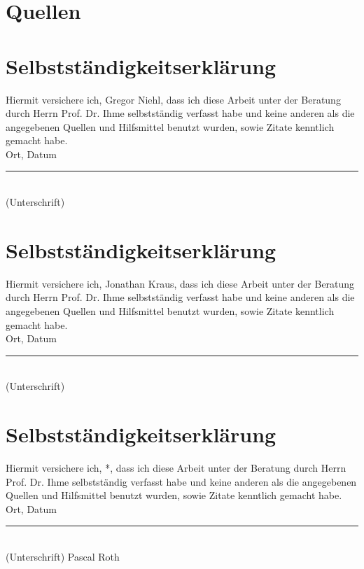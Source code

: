 \label{fig:architekturdiagramm}



\section*{Quellen}
\bib
\appendix

\newcommand{\selbststaendigkeitserklaerung}[1]{
	\newpage
	\section*{Selbstständigkeitserklärung}
	Hiermit versichere ich, {#1}, dass ich diese Arbeit unter der Beratung durch Herrn Prof. Dr. Ihme selbstständig verfasst habe und keine anderen als die angegebenen Quellen und Hilfsmittel benutzt wurden, sowie Zitate kenntlich gemacht habe. \\[2cm]

	Ort, Datum \hfill \rule{5cm}{0.4pt} \\
	\hfill (Unterschrift)
}

\selbststaendigkeitserklaerung{Gregor Niehl}
\selbststaendigkeitserklaerung{Jonathan Kraus}
\selbststaendigkeitserklaerung*{Pascal Roth}
